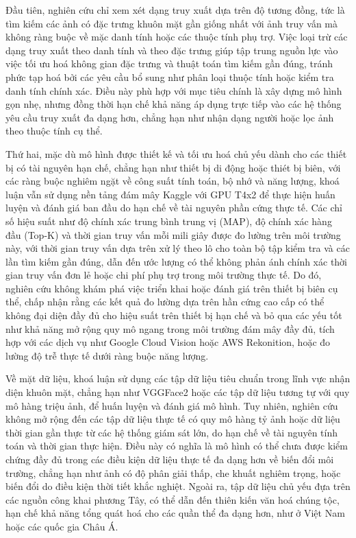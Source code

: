 Đầu tiên, nghiên cứu chỉ xem xét dạng truy xuất dựa trên độ tương đồng, tức là tìm kiếm các ảnh có đặc trưng khuôn mặt gần giống nhất với ảnh truy vấn mà không ràng buộc về mặc danh tính hoặc các thuộc tính phụ trợ. Việc loại trừ các dạng truy xuất theo danh tính và theo đặc trưng giúp tập trung nguồn lực vào việc tối ưu hoá không gian đặc trưng và thuật toán tìm kiếm gần đúng, tránh phức tạp hoá bởi các yêu cầu bổ sung như phân loại thuộc tính hoặc kiểm tra danh tính chính xác. Điều này phù hợp với mục tiêu chính là xây dựng mô hình gọn nhẹ, nhưng đồng thời hạn chế khả năng áp dụng trực tiếp vào các hệ thống yêu cầu truy xuất đa dạng hơn, chẳng hạn như nhận dạng người hoặc lọc ảnh theo thuộc tính cụ thể. 

Thứ hai, mặc dù mô hình được thiết kế và tối ưu hoá chủ yếu dành cho các thiết bị có tài nguyên hạn chế, chẳng hạn như thiết bị di động hoặc thiét bị biên, với các ràng buộc nghiêm ngặt về công suất tính toán, bộ nhớ và năng lượng, khoá luận vẫn sử dụng nền tảng đám mây Kaggle với GPU T4x2 để thực hiện huấn luyện và đánh giá ban đầu do hạn chế về tài nguyên phần cứng thực tế. Các chỉ số hiệu suất như độ chính xác trung bình trung vị (MAP), độ chính xác hàng đầu (Top-K) và thời gian truy vấn mỗi mili giây được đo lường trên môi trường này, với thời gian truy vấn dựa trên xử lý theo lô cho toàn bộ tập kiểm tra và các lần tìm kiếm gần đúng, dẫn đến ước lượng có thể không phản ánh chính xác thời gian truy vấn đơn lẻ hoặc chi phí phụ trợ trong môi trường thực tế. Do đó, nghiên cứu không khám phá việc triển khai hoặc đánh giá trên thiết bị biên cụ thể, chấp nhận rằng các kết quả đo lường dựa trên hần cứng cao cấp có thể không đại diện đầy đủ cho hiệu suất trên thiết bị hạn chế và bỏ qua các yếu tốt như khả năng mở rộng quy mô ngang trong môi trường đám mây đầy đủ, tích hợp với các dịch vụ như Google Cloud Vision hoặc AWS Rekonition, hoặc đo lường độ trễ thực tế dưới ràng buộc năng lượng.

Về mặt dữ liệu, khoá luận sử dụng các tập dữ liệu tiêu chuẩn trong lĩnh vực nhận diện khuôn mặt, chẳng hạn như VGGFace2 hoặc các tập dữ liệu tương tự với quy mô hàng triệu ảnh, để huấn luyện và đánh giá mô hình. Tuy nhiên, nghiên cứu không mở rộng đến các tập dữ liệu thực tế có quy mô hàng tỷ ảnh hoặc dữ liệu thời gian gần thực từ các hệ thống giám sát lớn, do hạn chế về tài nguyên tính toán và thời gian thực hiện. Điều này có nghĩa là mô hình có thể chưa được kiểm chứng đầy đủ trong các điều kiện dữ liệu thực tế đa dạng hơn về biến đổi môi trường, chẳng hạn như ảnh có độ phân giải thấp, che khuất nghiêm trọng, hoặc biến đổi do điều kiện thời tiết khắc nghiệt. Ngoài ra, tập dữ liệu chủ yếu đựa trên các nguồn công khai phương Tây, có thể dẫn đến thiên kiến văn hoá chúng tộc, hạn chế khả năng tổng quát hoá cho các quần thể đa dạng hơn, như ở Việt Nam hoặc các quốc gia Châu Á.

